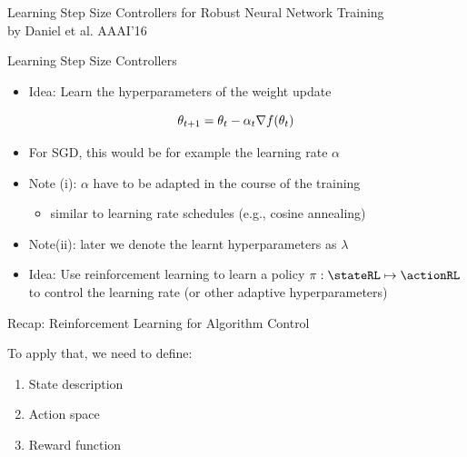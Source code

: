	
\begin{frame}[c]{}

\huge
\centering
Learning Step Size Controllers for Robust Neural Network Training\\
by Daniel et al. AAAI'16


\end{frame}
\begin{frame}[c]{Learning Step Size Controllers }

\begin{itemize}
\item \alert{Idea:} Learn the hyperparameters of the weight update 
\end{itemize}

\begin{equation}
\theta_{t+1} = \theta_t - \alpha_t \nabla f(\theta_t) \nonumber
\end{equation}

\begin{itemize}
\pause
\item For SGD, this would be for example the learning rate $\alpha$
\pause
\item \alert{Note (i)}: $\alpha$ have to be adapted in the course of the training
\begin{itemize}
\item similar to learning rate schedules (e.g., cosine annealing)
\end{itemize}
\pause
\item \alert{Note(ii)}: later we denote the learnt hyperparameters as $\lambda$
\medskip
\pause
\item \alert{Idea:} Use reinforcement learning to learn a policy $\policy: \stateRL \mapsto \actionRL$ to control the learning rate (or other adaptive hyperparameters)
\end{itemize}



\end{frame}
\begin{frame}[c]{Recap: Reinforcement Learning for Algorithm Control}



\bigskip
To apply that, we need to define:
\begin{enumerate}
	\item State description
	\item Action space
	\item Reward function
\end{enumerate}

\end{frame}

